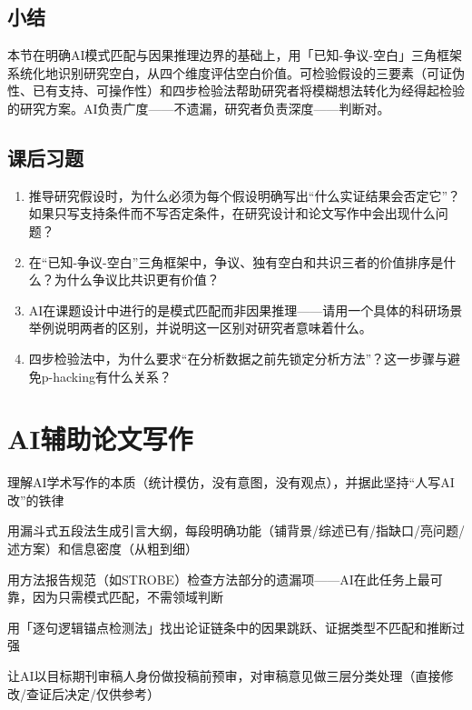 \subsection*{小结}
本节在明确AI模式匹配与因果推理边界的基础上，用「已知-争议-空白」三角框架系统化地识别研究空白，从四个维度评估空白价值。可检验假设的三要素（可证伪性、已有支持、可操作性）和四步检验法帮助研究者将模糊想法转化为经得起检验的研究方案。AI负责广度——不遗漏，研究者负责深度——判断对。

\bigskip
\subsection*{课后习题}
\begin{enumerate}
\setlength{\itemsep}{6pt}

\item 推导研究假设时，为什么必须为每个假设明确写出``什么实证结果会否定它''？如果只写支持条件而不写否定条件，在研究设计和论文写作中会出现什么问题？

\item 在``已知-争议-空白''三角框架中，争议、独有空白和共识三者的价值排序是什么？为什么争议比共识更有价值？

\item AI在课题设计中进行的是模式匹配而非因果推理——请用一个具体的科研场景举例说明两者的区别，并说明这一区别对研究者意味着什么。

\item 四步检验法中，为什么要求``在分析数据之前先锁定分析方法''？这一步骤与避免p-hacking有什么关系？

\end{enumerate}
\newpage

\section{AI辅助论文写作}
\label{sec:5.4}

\begin{sectionkeypoints}
\item 理解AI学术写作的本质（统计模仿，没有意图，没有观点），并据此坚持``人写AI改''的铁律
\item 用漏斗式五段法生成引言大纲，每段明确功能（铺背景/综述已有/指缺口/亮问题/述方案）和信息密度（从粗到细）
\item 用方法报告规范（如STROBE）检查方法部分的遗漏项——AI在此任务上最可靠，因为只需模式匹配，不需领域判断
\item 用「逐句逻辑锚点检测法」找出论证链条中的因果跳跃、证据类型不匹配和推断过强
\item 让AI以目标期刊审稿人身份做投稿前预审，对审稿意见做三层分类处理（直接修改/查证后决定/仅供参考）
\end{sectionkeypoints}

